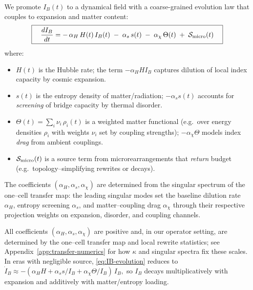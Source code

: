 \documentclass[11pt]{article}
\theoremstyle{plain}
\theoremstyle{definition}
\begin{document}
We promote $I_B(t)$ to a dynamical field with a coarse-grained evolution law that couples to expansion and matter content:
\begin{equation}
  \boxed{\quad
    \frac{d I_B}{dt}
    =
    -\,\alpha_H\,H(t)\,I_B(t)\;
    -\;\alpha_s\,s(t)\;
    -\;\alpha_\chi\,\Theta(t)\;
    +\;\mathcal{S}_{\rm micro}(t)
  \quad}
  \label{eq:IB-evolution}
\end{equation}
where:
\begin{itemize}[leftmargin=*]
  \item $H(t)$ is the Hubble rate; the term $-\alpha_H H I_B$ captures dilution of local index capacity by cosmic expansion.
  \item $s(t)$ is the entropy density of matter/radiation; $-\alpha_s s(t)$ accounts for \emph{screening} of bridge capacity by thermal disorder.
  \item $\Theta(t)=\sum_i \nu_i\,\rho_i(t)$ is a weighted matter functional (e.g.\ over energy densities $\rho_i$ with weights $\nu_i$ set by coupling strengths); $-\alpha_\chi \Theta$ models index \emph{drag} from ambient couplings.
  \item $\mathcal{S}_{\rm micro}(t)$ is a source term from microrearrangements that \emph{return} budget (e.g.\ topology–simplifying rewrites or decays).
\end{itemize}

The coefficients $(\alpha_H, \alpha_s, \alpha_\chi)$ are determined from the
singular spectrum of the one–cell transfer map: the leading singular modes
set the baseline dilution rate $\alpha_H$, entropy screening $\alpha_s$,
and matter–coupling drag $\alpha_\chi$ through their respective projection
weights on expansion, disorder, and coupling channels.

All coefficients $(\alpha_H,\alpha_s,\alpha_\chi)$ are positive and, in our operator setting,
are determined by the one–cell transfer map and local rewrite statistics;
see Appendix~\ref{app:transfer-numerics} for how $\kappa$ and singular spectra fix these scales.
In eras with negligible source, \eqref{eq:IB-evolution} reduces to
\(
  \dot I_B \approx -(\alpha_H H + \alpha_s s/I_B + \alpha_\chi \Theta/I_B)\, I_B,
\)
so $I_B$ decays multiplicatively with expansion and additively with matter/entropy loading.
\end{document}
